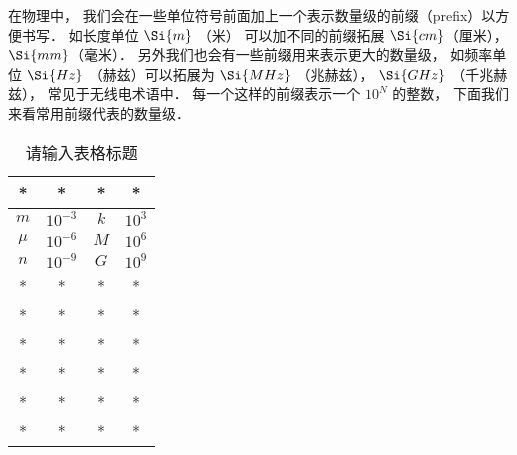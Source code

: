 
在物理中， 我们会在一些单位符号前面加上一个表示数量级的前缀（prefix）以方便书写． 如长度单位 $\Si{m}$ （米） 可以加不同的前缀拓展 $\Si{cm}$（厘米）， $\Si{mm}$（毫米）． 另外我们也会有一些前缀用来表示更大的数量级， 如频率单位 $\Si{Hz}$ （赫兹）可以拓展为 $\Si{MHz}$ （兆赫兹）， $\Si{GHz}$ （千兆赫兹）， 常见于无线电术语中． 每一个这样的前缀表示一个 $10^N$ 的整数， 下面我们来看常用前缀代表的数量级．

\begin{table}[ht]
\centering
\caption{请输入表格标题}\label{UniPre_tab1}
\begin{tabular}{|c|c|c|c|}
\hline
* & * & * & * \\
\hline
$m$ & $10^{-3}$ & $k$ & $10^3$ \\
\hline
$\mu$ & $10^{-6}$ & $M$ & $10^6$ \\
\hline
$n$ & $10^{-9}$ & $G$ & $10^9$ \\
\hline
* & * & * & * \\
\hline
* & * & * & * \\
\hline
* & * & * & * \\
\hline
* & * & * & * \\
\hline
* & * & * & * \\
\hline
* & * & * & * \\
\hline
\end{tabular}
\end{table}
